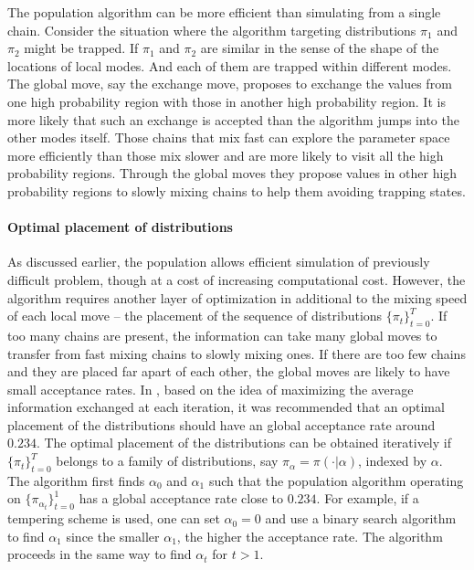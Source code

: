 The population \mcmc algorithm can be more efficient than simulating from a
single chain. Consider the situation where the \mcmc algorithm targeting
distributions $\pi_1$ and $\pi_2$ might be trapped. If $\pi_1$ and $\pi_2$ are
similar in the sense of the shape of the locations of local modes. And each of
them are trapped within different modes. The global move, say the exchange
move, proposes to exchange the values from one high probability region with
those in another high probability region. It is more likely that such an
exchange is accepted than the \mcmc algorithm jumps into the other modes
itself. Those chains that mix fast can explore the parameter space more
efficiently than those mix slower and are more likely to visit all the high
probability regions. Through the global moves they propose values in other
high probability regions to slowly mixing chains to help them avoiding
trapping states.

\paragraph{Optimal placement of distributions}

As discussed earlier, the population \mcmc allows efficient simulation of
previously difficult problem, though at a cost of increasing computational
cost. However, the algorithm requires another layer of optimization in
additional to the mixing speed of each local move -- the placement of the
sequence of distributions $\{\pi_t\}_{t=0}^T$. If too many chains are present,
the information can take many global moves to transfer from fast mixing chains
to slowly mixing ones. If there are too few chains and they are placed far
apart of each other, the global moves are likely to have small acceptance
rates. In \cite{Atchade:2010ha}, based on the idea of maximizing the average
information exchanged at each iteration, it was recommended that an optimal
placement of the distributions should have an global acceptance rate around
$0.234$. The optimal placement of the distributions can be obtained
iteratively if $\{\pi_t\}_{t=0}^T$ belongs to a family of distributions, say
$\pi_{\alpha} = \pi(\cdot|\alpha)$, indexed by $\alpha$. The algorithm first
finds $\alpha_0$ and $\alpha_1$ such that the population \mcmc algorithm
operating on $\{\pi_{\alpha_t}\}_{t=0}^1$ has a global acceptance rate close
to $0.234$. For example, if a tempering scheme is used, one can set $\alpha_0
= 0$ and use a binary search algorithm to find $\alpha_1$ since the smaller
$\alpha_1$, the higher the acceptance rate. The algorithm proceeds in the same
way to find $\alpha_t$ for $t>1$.

